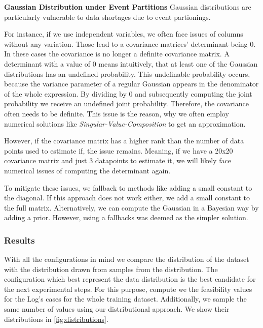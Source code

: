 \documentclass[./../../paper.tex]{subfiles}
\begin{document}
\noindent\textbf{Gaussian Distribution under Event Partitions}
Gaussian distributions are particularly vulnerable to data shortages due to event partionings.

For instance, if we use independent variables, we often face issues of columns without any variation. Those lead to a covariance matrices' determinant being 0. In these cases the covariance is no longer a definite covariance matrix. A determinant with a value of 0 means intuitively, that at least one of the Gaussian distributions has an undefined probability. This undefinable probability occurs, because the variance parameter of a regular Gaussian appears in the denominator of the whole expression. By dividing by 0 and subsequently computing the joint probability we receive an undefined joint probability. Therefore, the covariance often needs to be definite. This issue is the reason, why  we often employ numerical solutions like \emph{Singular-Value-Composition} to get an approximation.

However, if the covariance matrix has a higher rank than the number of data points used to estimate if, the issue remains. Meaning, if we have a 20x20 covariance matrix and just 3 datapoints to estimate it, we will likely face numerical issues of computing the determinant again.

To mitigate these issues, we fallback to methods like adding a small constant to the diagonal. If this approach does not work either, we add a small constant to the full matrix. Alternatively, we can compute the Gaussian in a Bayesian way by adding a prior. However, using a fallbacks was deemed as the simpler solution.

\subsubsection{Results}
With all the configurations in mind we compare the distribution of the dataset with the distribution drawn from samples from the distribution. The configuration which best represent the data distribution is the best candidate for the next experimental steps. For this purpose, compute we the feasibility values for the Log's cases for the whole training dataset. Additionally, we sample the same number of values using our distributional approach. We show their distributions in \autoref{fig:distributions}.
\end{document}
